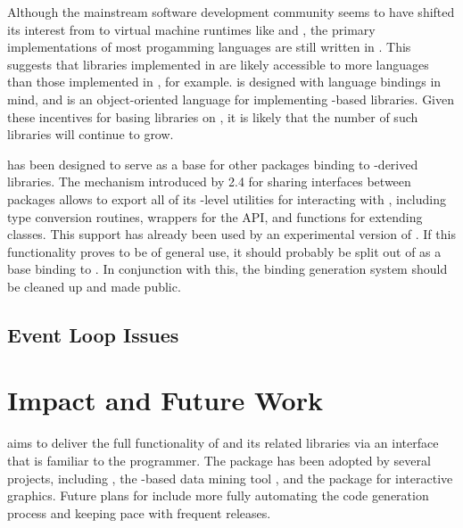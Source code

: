 \documentclass[article]{jss}
\begin{document}
Although the mainstream software development community seems to have
shifted its interest from  to virtual machine runtimes like
 and , the primary implementations of most 
progamming languages are still written in . This suggests that 
libraries implemented in  are likely accessible to more languages than
those implemented in , for example.  is designed
with language bindings in mind, and  is an object-oriented
language for implementing -based libraries.
Given these incentives for basing libraries on , it is likely
that the number of such libraries will continue to grow.

 has been designed to serve as a base for other 
packages binding to -derived libraries. The mechanism introduced
by  2.4 for sharing  interfaces between packages allows
 to export all of its -level utilities for 
interacting with , including type conversion routines, wrappers
for the  API, and functions for extending  classes.
This support has already been used by an experimental version of 
\citep{ggobi-beta}. If this functionality proves to be of general use, 
it should probably be split out of  as a base binding to .
In conjunction with this, the binding generation system should be cleaned up
and made public.

\subsection{Event Loop Issues}


\section{Impact and Future Work}

 aims to deliver the full functionality of  and its related
libraries via an interface that is familiar to the  programmer.
The package has been adopted by several projects, including  \citep{gwidgets}, the 
-based data mining tool  \citep{rattle}, and 
the  package \citep{plotandplaygtk} for interactive 
graphics. Future plans for  include more fully automating the code 
generation process and keeping pace with frequent  releases.
\end{document}
